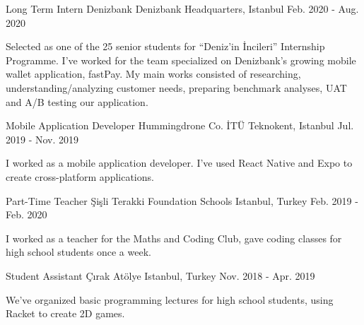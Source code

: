 

\begin{cventries}
\cventry
{Long Term Intern} %
{Denizbank} %
{Denizbank Headquarters, Istanbul} %
{Feb. 2020 - Aug. 2020} %
{ %
\begin{cvitems}
\item {Selected as one of the 25 senior students for ``Deniz'in İncileri'' Internship Programme. I've worked for the team specialized on Denizbank's growing mobile wallet application, fastPay. My main works consisted of researching, understanding/analyzing customer needs, preparing benchmark analyses, UAT and A/B testing our application.}
\end{cvitems}
}


\cventry
{Mobile Application Developer} %
{Hummingdrone Co.} %
{İTÜ Teknokent, Istanbul} %
{Jul. 2019 - Nov. 2019} %
{ %
\begin{cvitems}
\item {I worked as a mobile application developer. I've used React Native and Expo to create cross-platform applications.}
\end{cvitems}
}


\cventry
{Part-Time Teacher} %
{Şişli Terakki Foundation Schools} %
{Istanbul, Turkey} %
{Feb. 2019 - Feb. 2020} %
{ %
\begin{cvitems}
\item {I worked as a teacher for the Maths and Coding Club, gave coding classes for high school students once a week.}
\end{cvitems}
}


\cventry
{Student Assistant} %
{Çırak Atölye} %
{Istanbul, Turkey} %
{Nov. 2018 - Apr. 2019} %
{ %
\begin{cvitems}
\item {We've organized basic programming lectures for high school students, using Racket to create 2D games.}
\end{cvitems}
}


\end{cventries}
